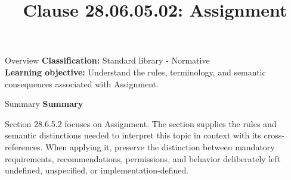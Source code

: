 \documentclass[10pt,letterpaper]{article}
\title{Clause 28.06.05.02: Assignment}
\author{}
\date{}
\begin{document}
\maketitle
\begin{CornellOverviewBox}{Overview}
\textbf{Classification:} Standard library - Normative\\[2pt]
\textbf{Learning objective:} Understand the rules, terminology, and semantic consequences associated with Assignment.
\end{CornellOverviewBox}\begin{CornellSummaryBox}{Summary}
{\sffamily\bfseries\color{Accent} Summary}\par\vspace{3pt}Section 28.6.5.2 focuses on Assignment. The section supplies the rules and semantic distinctions needed to interpret this topic in context with its cross-references. When applying it, preserve the distinction between mandatory requirements, recommendations, permissions, and behavior deliberately left undefined, unspecified, or implementation-defined.
\end{CornellSummaryBox}
\end{document}
